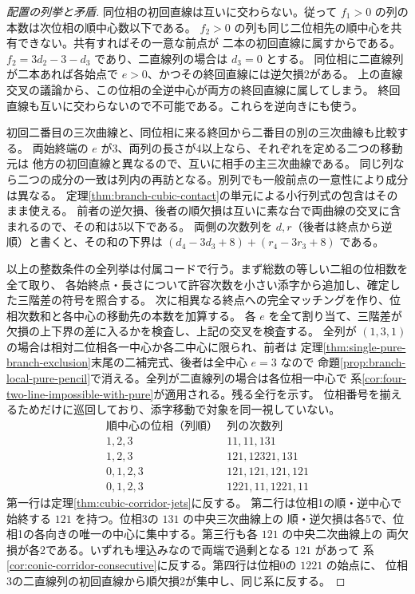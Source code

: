 \begin{proof}[配置の列挙と矛盾]
同位相の初回直線は互いに交わらない。従って $f_1>0$ の列の本数は次位相の順中心数以下である。
$f_2>0$ の列も同じ二位相先の順中心を共有できない。共有すればその一意な前点が
二本の初回直線に属すからである。$f_2=3d_2-3-d_3$ であり、二直線列の場合は $d_3=0$ とする。
同位相に二直線列が二本あれば各始点で $e>0$、かつその終回直線には逆欠損2がある。
上の直線交叉の議論から、この位相の全逆中心が両方の終回直線に属してしまう。
終回直線も互いに交わらないので不可能である。これらを逆向きにも使う。

初回二番目の三次曲線と、同位相に来る終回から二番目の別の三次曲線も比較する。
両始終端の $e$ が3、両列の長さが4以上なら、それぞれを定める二つの移動元は
他方の初回直線と異なるので、互いに相手の主三次曲線である。
同じ列なら二つの成分の一致は列内の再訪となる。別列でも一般前点の一意性により成分は異なる。
定理\ref{thm:branch-cubic-contact}の単元による小行列式の包含はそのまま使える。
前者の逆欠損、後者の順欠損は互いに素な台で両曲線の交叉に含まれるので、その和は5以下である。
両側の次数列を $d,r$（後者は終点から逆順）と書くと、その和の下界は
$(d_4-3d_3+8)+(r_4-3r_3+8)$ である。

以上の整数条件の全列挙は付属コードで行う。まず総数の等しい二組の位相数を全て取り、
各始終点・長さについて許容次数を小さい添字から追加し、確定した三階差の符号を照合する。
次に相異なる終点への完全マッチングを作り、位相次数和と各中心の移動先の本数を加算する。
各 $e$ を全て割り当て、三階差が欠損の上下界の差に入るかを検査し、上記の交叉を検査する。
全列が $(1,3,1)$ の場合は相対二位相各一中心か各二中心に限られ、前者は
定理\ref{thm:single-pure-branch-exclusion}末尾の二補完式、後者は全中心 $e=3$ なので
命題\ref{prop:branch-local-pure-pencil}で消える。全列が二直線列の場合は各位相一中心で
系\ref{cor:four-two-line-impossible-with-pure}が適用される。残る全行を示す。
位相番号を揃えるためだけに巡回しており、添字移動で対象を同一視していない。
\[
\begin{array}{c|l}
\text{順中心の位相（列順）}&\text{列の次数列}\\\hline
1,2,3&11,11,131\\
1,2,3&121,12321,131\\
0,1,2,3&121,121,121,121\\
0,1,2,3&1221,11,1221,11
\end{array}
\]
第一行は定理\ref{thm:cubic-corridor-jets}に反する。
第二行は位相1の順・逆中心で始終する $121$ を持つ。位相3の $131$ の中央三次曲線上の
順・逆欠損は各5で、位相1の各向きの唯一の中心に集中する。第三行も各 $121$ の中央二次曲線上の
両欠損が各2である。いずれも埋込みなので両端で過剰となる $121$ があって
系\ref{cor:conic-corridor-consecutive}に反する。第四行は位相0の $1221$ の始点に、
位相3の二直線列の初回直線から順欠損2が集中し、同じ系に反する。
\end{proof}

